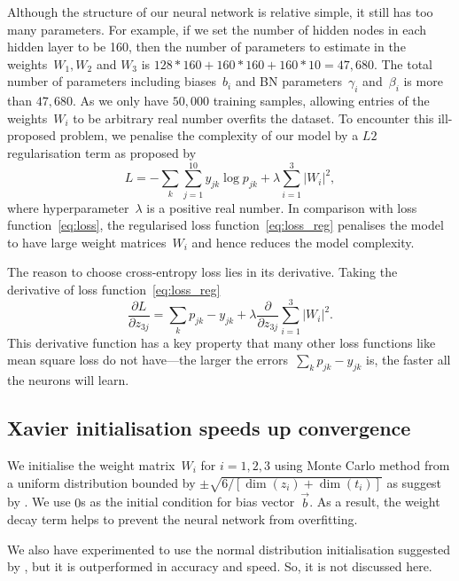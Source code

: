 Although the structure of our neural network is relative simple, it still has too many parameters. For example, if we set the number of hidden nodes in each hidden layer to be 160, then the number of parameters to estimate in the weights~$W_1,W_2$ and $W_3$ is $128*160+160*160+160*10=47,680$. The total number of parameters including biases~$b_i$ and BN parameters~$\gamma_i$ and~$\beta_i$ is more than $47,680$. As we only have $50,000$ training samples, allowing entries of the weights~$W_i$ to be arbitrary real number overfits the dataset. To encounter this ill-proposed problem, we penalise the complexity of our model by a $L2$ regularisation term as proposed by \citet{doi:10.1080/00401706.1970.10488634}
\begin{equation}
  {L=-\sum_k\sum _{j=1}^{10} y_{jk}\log p_{jk}}+\lambda\sum _{i=1}^3\left|W_i\right|^2,  \label{eq:loss_reg}
\end{equation}
where hyperparameter~$\lambda$ is a positive real number.
In comparison with loss function~\eqref{eq:loss}, the regularised loss function~\eqref{eq:loss_reg} penalises the model to have large weight matrices~$W_i$ and hence reduces the model complexity.

The reason to choose cross-entropy loss lies in its derivative. Taking the derivative of loss function~\eqref{eq:loss_reg}
\begin{equation*}
  \frac{\partial L}{\partial z_{3j}}=\sum_k p_{jk}-y_{jk}+\lambda\frac{\partial }{\partial z_{3j}}\sum _{i=1}^3\left|W_i\right|^2.  
\end{equation*}
This derivative function has a key property that many other loss functions like mean square loss do not have---the larger the errors~$\sum_k p_{jk}-y_{jk}$ is, the faster all the neurons will learn.

\subsection{Xavier initialisation speeds up convergence}
We initialise the weight matrix~$W_i$ for $i=1,2,3$ using Monte Carlo method from a uniform distribution bounded by $\pm \sqrt{6/\left[\dim(z_i)+\dim(t_i)\right]}$ as suggest by \citet{pmlr-v9-glorot10a}. We use $0$s as the initial condition for bias vector~$\vec b$. As a result, the weight decay term helps to prevent the neural network from overfitting.

We also have experimented to use the normal distribution initialisation suggested by \citet{pmlr-v9-glorot10a}, but it is outperformed in accuracy and speed. So, it is not discussed here.

